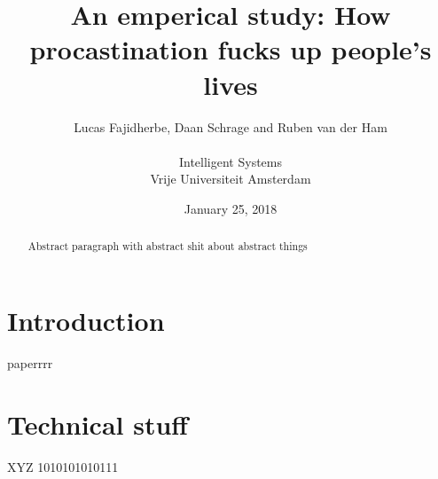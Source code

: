 \documentclass[a4paper,12pt]{article}
\title{An emperical study: How procastination fucks up people's lives}
\date{January 25, 2018}
\author{Lucas Fajidherbe, Daan Schrage and Ruben van der Ham\\\\
	\small Intelligent Systems\\
	\small Vrije Universiteit Amsterdam}
\begin{document}
\maketitle
\titlepage

\tableofcontents
\clearpage

\begin{abstract}
Abstract paragraph with abstract shit about abstract things
\end{abstract}

\section{Introduction}

paperrrr

\section{Technical stuff}
XYZ 1010101010111
\end{document}
